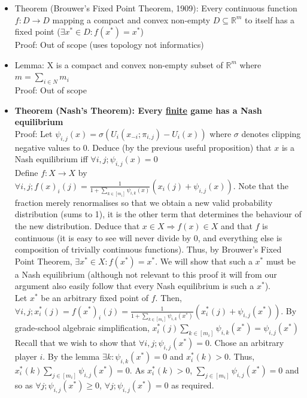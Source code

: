 \documentclass[20pt,a4paper,landscape]{extarticle}
\begin{document}
\begin{flushleft}
\begin{itemize}
\item Theorem (Brouwer's Fixed Point Theorem, 1909): Every continuous function $f : D \to D$ mapping a compact and convex non-empty $D \subseteq \mathds{R}^m$ to itself has a fixed point ($\exists x^\ast \in D: f (x^\ast) = x^\ast$)\\
Proof: Out of scope (uses topology not informatics)
\item Lemma: X is a compact and convex non-empty subset of $\mathds{R}^m$ where $m = \sum_{i \in N} m_i$\\
Proof: Out of scope
\clearpage
\item \textbf{Theorem (Nash's Theorem): Every \underline{finite} game has a Nash equilibrium}\\
Proof: Let $\psi_{i,j}(x) = \sigma\left(U_i(x_{-i}; \pi_{i,j}) - U_i(x)\right)$ where $\sigma$ denotes clipping negative values to 0. Deduce (by the previous useful proposition) that $x$ is a Nash equilibrium iff $\forall i, j; \psi_{i,j}(x) = 0$\\
Define $f: X \to X$ by $\forall i, j; f(x)_i(j) = \frac{1}{1 + \sum_{k \in [m_i]} \psi_{i,k}(x)}\left(x_i(j) + \psi_{i,j}(x)\right)$. Note that the fraction merely renormalises so that we obtain a new valid probability distribution (sums to 1), it is the other term that determines the behaviour of the new distribution.
Deduce that $x \in X \Rightarrow f(x) \in X$ and that $f$ is continuous (it is easy to see will never divide by 0, and everything else is composition of trivially continuous functions). Thus, by Brouwer's Fixed Point Theorem, $\exists x^\ast \in X: f(x^\ast) = x^\ast$. We will show that such a $x^\ast$ must be a Nash equilibrium (although not relevant to this proof it will from our argument also easily follow that every Nash equilibrium is such a $x^\ast$).\\
Let $x^\ast$ be an arbitrary fixed point of $f$. Then, $\forall i, j; x^\ast_i(j) = f(x^\ast)_i(j) = \frac{1}{1 + \sum_{k \in [m_i]} \psi_{i,k}(x^\ast)}\left(x^\ast_i(j) + \psi_{i,j}(x^\ast)\right)$. By grade-school algebraic simplification, $x^\ast_i(j)\sum_{k \in [m_i]}\psi_{i,k}(x^\ast) = \psi_{i,j}(x^\ast)$\\
Recall that we wish to show that $\forall i, j; \psi_{i,j}(x^\ast) = 0$.
Chose an arbitrary player $i$. By the lemma $\exists k: \psi_{i,k}(x^\ast) = 0$ and $x^\ast_i(k) > 0$. Thus, $x^\ast_i(k)\sum_{j \in [m_i]}\psi_{i,j}(x^\ast) = 0$. As $x^\ast_i(k) > 0$, $\sum_{j \in [m_i]}\psi_{i,j}(x^\ast) = 0$ and so  as $\forall j; \psi_{i,j}(x^\ast) \geq 0$, $\forall j; \psi_{i,j}(x^\ast) = 0$ as required.

\end{itemize}
\end{flushleft}
\end{document}
